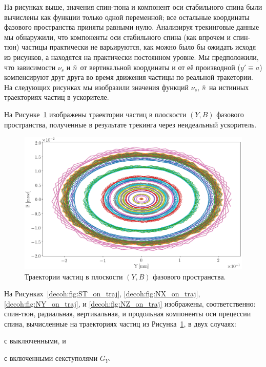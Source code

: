 На рисунках выше, значения спин-тюна и компонент оси стабильного спина были вычислены как функции только одной переменной; все остальные координаты фазового пространства приняты равными нулю. Анализируя трекинговые данные мы обнаружили, что компоненты оси стабильного спина (как впрочем и спин-тюн) частицы практически не варьируются, как можно было бы ожидать исходя из рисунков, а находятся на практически постоянном уровне. Мы предположили, что зависимости $\nu_s$ и $\bar n$ от вертикальной координаты и от её производной ($y'\equiv a$) компенсируют друг друга во время движения частицы по реальной тракетории. На следующих рисунках мы изобразили значения функций $\nu_s$, $\bar n$ на истинных траекториях частиц в ускорителе.

На Рисунке~\ref{decoh:fig:yb_traj} изображены траектории частиц в плоскости $(Y,B)$ фазового пространства, полученные в результате трекинга через неидеальный ускоритель.
\begin{figure}[H]
	\centering
	\includegraphics[height=.35\paperheight]{images/decoh_sim/YB-PHASE_SPACE_IMPERFECT_UNOPT}
	\caption{Траектории частиц в плоскости $(Y,B)$ фазового пространства.\label{decoh:fig:yb_traj}} 
\end{figure}

На Рисунках~\ref{decoh:fig:ST_on_traj}, \ref{decoh:fig:NX_on_traj}, \ref{decoh:fig:NY_on_traj}, и \ref{decoh:fig:NZ_on_traj} изображены, соответственно: спин-тюн, радиальная, вертикальная, и продольная компоненты оси прецессии спина, вычисленные на траекториях частиц из Рисунка~\ref{decoh:fig:yb_traj}, в двух случаях:
\begin{enumerate*}
	\item с выключенными, и 
	\item с включенными секступолями $G_Y$.
\end{enumerate*}  

